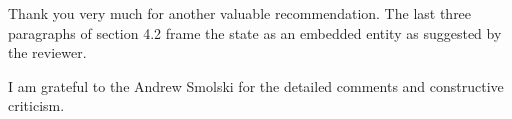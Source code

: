 \documentclass[a4paper,12pt]{article}
\begin{document}
\vspace{.25cm}

Thank you very much for another valuable recommendation. The last three paragraphs of section 4.2 frame the state as an embedded entity as suggested by the reviewer. 

\vspace{.5cm}

I am grateful to the Andrew Smolski for the detailed comments and constructive criticism.  


\newpage


\end{document}
